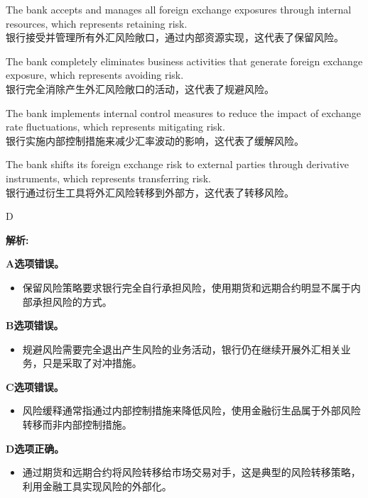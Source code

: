 \documentclass{article}
\newenvironment{explanation}
{\textbf{解析:}\par}
{\par}
\begin{document}
        \begin{choices}
            \item The bank accepts and manages all foreign exchange exposures through internal resources, which represents retaining risk. \\
            银行接受并管理所有外汇风险敞口，通过内部资源实现，这代表了保留风险。
            
            \item The bank completely eliminates business activities that generate foreign exchange exposure, which represents avoiding risk. \\
            银行完全消除产生外汇风险敞口的活动，这代表了规避风险。
            
            \item The bank implements internal control measures to reduce the impact of exchange rate fluctuations, which represents mitigating risk. \\
            银行实施内部控制措施来减少汇率波动的影响，这代表了缓解风险。
            
            \item The bank shifts its foreign exchange risk to external parties through derivative instruments, which represents transferring risk. \\
            银行通过衍生工具将外汇风险转移到外部方，这代表了转移风险。
            \end{choices}
        
        \begin{correctanswer}
        D
        \end{correctanswer}
        
        \begin{explanation}
        \textbf{A选项错误。}
        \begin{itemize}
            \item 保留风险策略要求银行完全自行承担风险，使用期货和远期合约明显不属于内部承担风险的方式。
        \end{itemize}
        
        \textbf{B选项错误。}
        \begin{itemize}
            \item 规避风险需要完全退出产生风险的业务活动，银行仍在继续开展外汇相关业务，只是采取了对冲措施。
        \end{itemize}
        
        \textbf{C选项错误。}
        \begin{itemize}
            \item 风险缓释通常指通过内部控制措施来降低风险，使用金融衍生品属于外部风险转移而非内部控制措施。
        \end{itemize}
        
        \textbf{D选项正确。}
        \begin{itemize}
            \item 通过期货和远期合约将风险转移给市场交易对手，这是典型的风险转移策略，利用金融工具实现风险的外部化。
        \end{itemize}
        \end{explanation}
        
\end{document}
